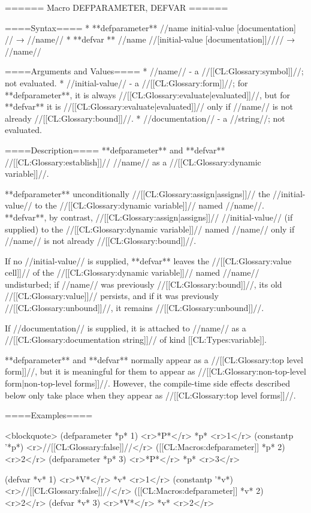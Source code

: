 ====== Macro DEFPARAMETER, DEFVAR ======

====Syntax====
  * **defparameter** //name initial-value [documentation] // → //name// 
  * **defvar ** //name //[initial-value [documentation]]//// → //name//

====Arguments and Values====
  * //name// - a //[[CL:Glossary:symbol]]//; not evaluated.
  * //initial-value// - a //[[CL:Glossary:form]]//; for **defparameter**, it is always //[[CL:Glossary:evaluate|evaluated]]//, but for **defvar** it is //[[CL:Glossary:evaluate|evaluated]]// only if //name// is not already //[[CL:Glossary:bound]]//.
  * //documentation// - a //string//; not evaluated.

====Description====
**defparameter** and **defvar** //[[CL:Glossary:establish]]// //name// as a //[[CL:Glossary:dynamic variable]]//.

**defparameter** unconditionally //[[CL:Glossary:assign|assigns]]// the //initial-value// to the //[[CL:Glossary:dynamic variable]]// named //name//. **defvar**, by contrast, //[[CL:Glossary:assign|assigns]]// //initial-value// (if supplied) to the //[[CL:Glossary:dynamic variable]]// named //name// only if //name// is not already //[[CL:Glossary:bound]]//.

If no //initial-value// is supplied, **defvar** leaves the //[[CL:Glossary:value cell]]// of the //[[CL:Glossary:dynamic variable]]// named //name// undisturbed; if //name// was previously //[[CL:Glossary:bound]]//, its old //[[CL:Glossary:value]]// persists, and if it was previously //[[CL:Glossary:unbound]]//, it remains //[[CL:Glossary:unbound]]//.

If //documentation// is supplied, it is attached to //name// as a //[[CL:Glossary:documentation string]]// of kind [[CL:Types:variable]].

**defparameter** and **defvar** normally appear as a //[[CL:Glossary:top level form]]//, but it is meaningful for them to appear as //[[CL:Glossary:non-top-level form|non-top-level forms]]//. However, the compile-time side effects described below only take place when they appear as //[[CL:Glossary:top level forms]]//.

====Examples====

<blockquote>
(defparameter *p* 1) <r>*P*</r>
*p* <r>1</r>
(constantp '*p*) <r>//[[CL:Glossary:false]]//</r>
([[CL:Macros:defparameter]] *p* 2) <r>2</r>
(defparameter *p* 3) <r>*P*</r>
*p* <r>3</r>

(defvar *v* 1) <r>*V*</r>
*v* <r>1</r>
(constantp '*v*) <r>//[[CL:Glossary:false]]//</r>
([[CL:Macros:defparameter]] *v* 2) <r>2</r>
(defvar *v* 3) <r>*V*</r>
*v* <r>2</r>

